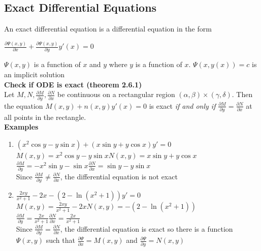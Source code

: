 \documentclass{article}
\begin{document}
\subsection{Exact Differential Equations}
\label{sec:fexact}
An exact differential equation is a differential equation in the form
\begin{center}
   $\frac{\partial\Psi(x,y)}{\partial x}+\frac{\partial\Psi(x,y)}{\partial y}y'(x)=0$ 
\end{center}
$\Psi(x,y)$ is a function of $x$ and $y$ where $y$ is a function of $x$. $\Psi(x,y(x))=c$ is an implicit solution\\
\newline
\textbf{Check if ODE is exact (theorem 2.6.1)}\\
Let $M,N,\frac{\partial M}{\partial y},\frac{\partial N}{\partial x}$ be continuous on a rectangular region $(\alpha,\beta)\times(\gamma,\delta)$. Then the equation $M(x,y)+n(x,y)y'(x)=0$ is exact \textit{if and only if} $\frac{\partial M}{\partial y}=\frac{\partial N}{\partial x}$ at all points in the rectangle.\\
\newline
\textbf{Examples}
\begin{enumerate}
    \item $(x^2\cos y-y\sin x)+(x\sin y+y\cos x)y'=0$\\
    $M(x,y)=x^2\cos y-y\sin x$\hspace*{0.5in}$N(x,y)=x\sin y+y\cos x$\\
    $\frac{\partial M}{\partial y}=-x^2\sin y-\sin x$\hspace*{0.5in}$\frac{\partial N}{\partial x}=\sin y-y\sin x$\\
    Since $\frac{\partial M}{\partial y}\neq\frac{\partial N}{\partial x}$, the differential equation is not exact
    \item $\frac{2xy}{x^2+1}-2x-(2-\ln(x^2+1))y'=0$\\
    $M(x,y)=\frac{2xy}{x^2+1}-2x$\hspace*{0.5in}$N(x,y)=-(2-\ln(x^2+1))$\\
    $\frac{\partial M}{\partial y}=\frac{2x}{x^2+1}$\hspace*{0.5in}$\frac{\partial N}{\partial x}=\frac{2x}{x^2+1}$\\
    Since $\frac{\partial M}{\partial y}=\frac{\partial N}{\partial x}$, the differential equation is exact so there is a function $\Psi(x,y)$ such that $\frac{\partial\Psi}{\partial x}=M(x,y)$ and $\frac{\partial\Psi}{\partial y}=N(x,y)$
\end{enumerate}
\end{document}
